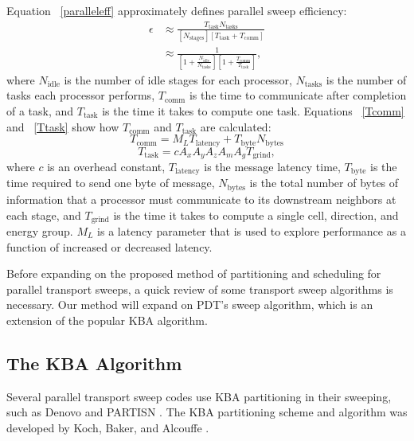 \documentclass[11pt, letterpaper,titlepage,oneside]{article}
\begin{document}
Equation ~\eqref{paralleleff} approximately defines parallel sweep efficiency:
\begin{equation}\label{paralleleff}
\begin{split}
\epsilon &\approx \frac{T_{\text{task}} N_{\text{tasks}}}{[N_{\text{stages}}] [T_{\text{task}} + T_{\text{comm}}]} \\
            &\approx\frac{1}{[1+\frac{N_{\text{idle}}}{N_{\text{tasks}}}][1 + \frac{T_{\text{comm}}}{T_{\text{task}}}]},
\end{split}
\end{equation}
where $N_\text{idle}$ is the number of idle stages for each processor, $N_\text{tasks}$ is the number of tasks each processor performs, $T_\text{comm}$ is the time to communicate after completion of a task, and $T_\text{task}$ is the time it takes to compute one task.
Equations ~\eqref{Tcomm} and ~\eqref{Ttask} show how $T_{\text{comm}}$ and $T_{\text{task}}$ are calculated:
\begin{equation}
T_{\text{comm}} = M_L T_{\text{latency}} + T_{\text{byte}} N_{\text{bytes}}
\label{Tcomm}
\end{equation}
\begin{equation}
T_{\text{task}} = cA_x A_y A_z A_m A_g T_{\text{grind}},
\label{Ttask}
\end{equation}
where $c$ is an overhead constant, $T_{\text{latency}}$ is the message latency time, $T_{\text{byte}}$ is the time required to send one byte of message, $N_{\text{bytes}}$ is the total number of bytes of information that a processor must communicate to its downstream neighbors at each stage, and $T_{\text{grind}}$ is the time it takes to compute a single cell, direction, and energy group. $M_L$ is a latency parameter that is used to explore performance as a function of increased or decreased latency.

Before expanding on the proposed method of partitioning and scheduling for parallel transport sweeps, a quick review of some transport sweep algorithms is necessary. Our method will expand on PDT's sweep algorithm\cite{mpadams2013}, which is an extension of the popular KBA algorithm\cite{KBA}.

\subsection{The KBA Algorithm}

Several parallel transport sweep codes use KBA partitioning in their sweeping, such as Denovo \cite{denovo} and PARTISN \cite{partisn}. The KBA partitioning scheme and algorithm was developed by Koch, Baker, and Alcouffe \cite{KBA}.
\end{document}
